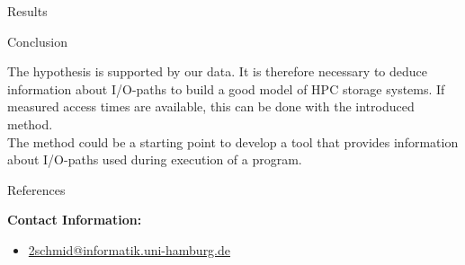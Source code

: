 \documentclass[final]{beamer}
\newlength{\onecolwid}
\begin{document}
\begin{frame}[t]
\begin{columns}[t]
\begin{column}{\onecolwid}
\begin{block}{Results}
\end{block}


\vspace*{-1.7cm}
\begin{block}{Conclusion}

	The hypothesis is supported by our data.
	It is therefore necessary to deduce information about I/O-paths to build a good model of HPC storage systems.
	If measured access times are available, this can be done with the introduced method.\\
	The method could be a starting point to develop a tool that provides information about I/O-paths used during execution of a program.
	
	

\end{block}


\vspace*{-0.5cm}
\begin{block}{References}

\nocite{*} %
\tiny{
\vspace{0.75in}}

\end{block}

	\footnotesize
	
	\vspace*{-2.4cm}
	\begin{exampleblock}{}
		\vspace*{-1cm}
		\textbf{Contact Information:}
		\vspace*{-0.4cm}
		\begin{itemize}
			\item \href{mailto:2schmid@informatik.uni-hamburg.de}{2schmid@informatik.uni-hamburg.de}
		\end{itemize}
		

\end{exampleblock}
\end{column}
\end{columns}
\end{frame}
\end{document}
